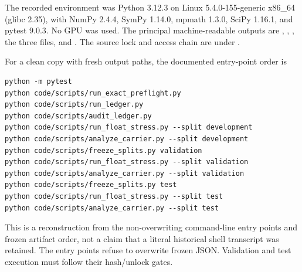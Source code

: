 \documentclass[11pt]{article}
\theoremstyle{definition}
\theoremstyle{remark}
\begin{document}
The recorded environment was Python 3.12.3 on Linux
5.4.0-155-generic x86\_64 (glibc 2.35), with NumPy 2.4.4, SymPy 1.14.0,
mpmath 1.3.0, SciPy 1.16.1, and pytest 9.0.3.  No GPU was used.  The principal
machine-readable outputs are
, ,
, the three
 files, and
.  The source lock and access chain
are under .

For a clean copy with fresh output paths, the documented entry-point order is
\begin{verbatim}
python -m pytest
python code/scripts/run_exact_preflight.py
python code/scripts/run_ledger.py
python code/scripts/audit_ledger.py
python code/scripts/run_float_stress.py --split development
python code/scripts/analyze_carrier.py --split development
python code/scripts/freeze_splits.py validation
python code/scripts/run_float_stress.py --split validation
python code/scripts/analyze_carrier.py --split validation
python code/scripts/freeze_splits.py test
python code/scripts/run_float_stress.py --split test
python code/scripts/analyze_carrier.py --split test
\end{verbatim}
This is a reconstruction from the non-overwriting command-line entry points
and frozen artifact order, not a claim that a literal historical shell
transcript was retained.  The entry points refuse to overwrite frozen JSON.
Validation and test execution must follow their hash/unlock gates.



\end{document}
